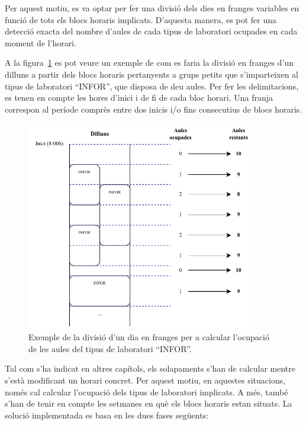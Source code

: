 \documentclass[a4paper,12pt]{ThesisStyle}
\begin{document}
Per aquest motiu, es va optar per fer una divisió dels dies en franges variables en funció de tots els blocs horaris implicats. D'aquesta manera, es pot fer una detecció exacta del nombre d'aules de cada tipus de laboratori ocupades en cada moment de l'horari.

A la figura~\ref{img:franges} es pot veure un exemple de com es faria la divisió en franges d'un dilluns a partir dels blocs horaris pertanyents a grups petits que s'imparteixen al tipus de laboratori ``INFOR'', que disposa de deu aules. Per fer les delimitacions, es tenen en compte les hores d'inici i de fi de cada bloc horari. Una franja correspon al període comprès entre dos inicis i/o fins consecutius de blocs horaris.

\newpage

\begin{figure}[H]
  \centering
  \includegraphics[width=0.9\textwidth]{assets/figs/franges.pdf}
  \caption{\label{img:franges} Exemple de la divisió d'un dia en franges per a calcular l'ocupació de les aules del tipus de laboratori ``INFOR''.}
\end{figure}

Tal com s'ha indicat en altres capítols, els solapaments s'han de calcular mentre s'està modificant un horari concret. Per aquest motiu, en aquestes situacions, només cal calcular l'ocupació dels tipus de laboratori implicats. A més, també s'han de tenir en compte les setmanes en què els blocs horaris estan situats. La solució implementada es basa en les dues fases següents:
\end{document}
